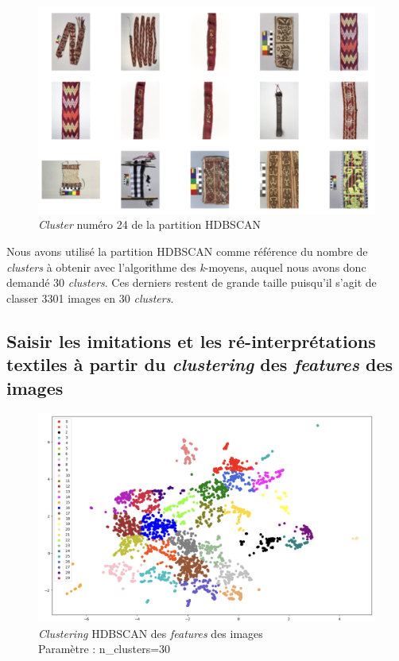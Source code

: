 \begin{figure}[!h]
	\begin{center}
		\includegraphics[width=12cm]{../images/YOLO_NS_HDBSCAN_24.png}
		\caption{\textit{Cluster} numéro 24 de la partition HDBSCAN}
	 \end{center}
\end{figure}

Nous avons utilisé la partition HDBSCAN comme référence du nombre de \textit{clusters} à obtenir avec l'algorithme des \textit{k}-moyens, auquel nous avons donc demandé 30 \textit{clusters}. Ces derniers restent de grande taille puisqu'il s'agit de classer 3301 images en 30 \textit{clusters}.

\subsection{Saisir les imitations et les ré-interprétations textiles à partir du \textit{clustering} des \textit{features} des images}

\begin{figure}[!h]
	\begin{center}
		\includegraphics[width=16cm]{../images/YOLO_NS_KMEAN.png}
		\caption{\textit{Clustering} HDBSCAN des \textit{features} des images \\ Paramètre : n\_clusters=30}
	 \end{center}
\end{figure}

